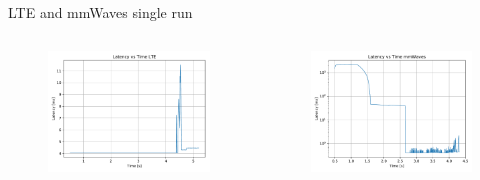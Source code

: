 \documentclass{beamer}
\begin{document}
\begin{frame}{LTE and mmWaves single run}
\begin{columns}
\begin{figure}
					\includegraphics[scale=0.28]{latency_lte_UDP}
				\end{figure}
				\begin{figure}
					\vspace{-0.2in}
					\includegraphics[scale=0.28]{latency_mmWaves_UDP}
				\end{figure}
		\end{columns}
	\end{frame}
\end{document}
